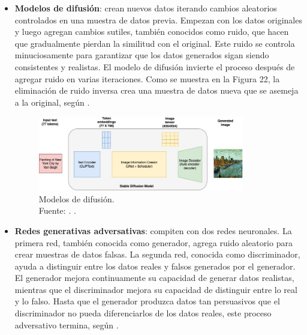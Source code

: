 \begin{itemize}
	\item \textbf{Modelos de difusión}: crean nuevos datos iterando cambios aleatorios controlados en una muestra de datos previa. Empezan con los datos originales y luego agregan cambios sutiles, también conocidos como ruido, que hacen que gradualmente pierdan la similitud con el original. Este ruido se controla minuciosamente para garantizar que los datos generados sigan siendo consistentes y realistas. El modelo de difusión invierte el proceso después de agregar ruido en varias iteraciones. Como se muestra en la Figura 22, la eliminación de ruido inversa crea una muestra de datos nueva que se asemeja a la original, según \parencite{tec_amaz2023iagen}.
	
	\begin{figure}[!ht]
		\begin{center}
			\includegraphics[width=0.85\textwidth]{2/figures/modelosdedifusion.jpg}
			\caption[Modelos de difusión]{Modelos de difusión.\\
			Fuente: \cite{tec_amaz2023iagen}. .}
			\label{2:fig8}
		\end{center}
	\end{figure}

	\item \textbf{Redes generativas adversativas}: compiten con dos redes neuronales. La primera red, también conocida como generador, agrega ruido aleatorio para crear muestras de datos falsas. La segunda red, conocida como discriminador, ayuda a distinguir entre los datos reales y falsos generados por el generador. El generador mejora continuamente su capacidad de generar datos realistas, mientras que el discriminador mejora su capacidad de distinguir entre lo real y lo falso. Hasta que el generador produzca datos tan persuasivos que el discriminador no pueda diferenciarlos de los datos reales, este proceso adversativo termina, según \parencite{tec_amaz2023iagen}.


\end{itemize}
